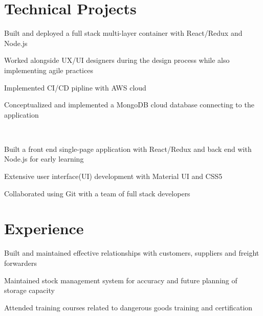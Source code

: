 \documentclass[]{deedy-resume-openfont}
\begin{document}
\hfill
\begin{minipage}[t]{4in} 


\section{Technical Projects}
\vspace{\topsep} %
\begin{tightemize}
\item Built and deployed a full stack multi-layer container with React/Redux and Node.js
\item Worked alongside UX/UI designers during the design process while also implementing agile practices
\item Implemented CI/CD pipline with AWS cloud
\item Conceptualized and implemented a MongoDB cloud database connecting to the application
\end{tightemize}
\sectionsep

 \\
\vspace{\topsep}
\begin{tightemize}
\item Built a front end single-page application with React/Redux and back end with Node.js for early learning \\
\item Extensive user interface(UI) development with Material UI and CSS5
\item Collaborated using Git with a team of full stack developers
\end{tightemize}
\sectionsep



\section{Experience}

\begin{tightemize}
\item Built and maintained effective relationships with customers, suppliers and freight forwarders
\item Maintained stock management system for accuracy and future planning of storage capacity
\item Attended training courses related to dangerous goods training and certification
\end{tightemize}
\sectionsep


\end{minipage}
\end{document}
